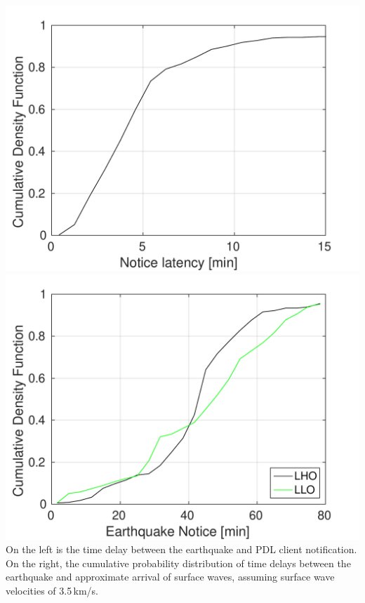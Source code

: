 \documentclass[a0paper,portrait]{baposter}
\begin{document}
\begin{poster}
{ \includegraphics[width=0.49\linewidth]{plots/earthquake_notice.pdf}
 \includegraphics[width=0.49\linewidth]{plots/lockloss_notice.pdf}
 On the left is the time delay between the earthquake and PDL client notification. On the right,
the cumulative probability distribution of time delays between the earthquake and approximate arrival of surface waves, assuming surface wave velocities of 3.5\,km/s. \\



}

\end{poster}
\end{document}
